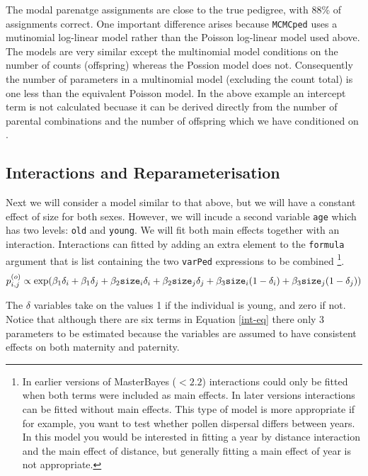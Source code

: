 \documentclass{article}
\begin{document}
The modal parenatge assignments are close to the true pedigree, with 88\% of assignments correct. One important difference arises because \texttt{MCMCped} uses a mutinomial log-linear model rather than the Poisson log-linear model used above.  The models are very similar except the multinomial model conditions on the number of counts (offspring) whereas the Possion model does not. Consequently the number of parameters in a multinomial model (excluding the count total) is one less than the equivalent Poisson model. In the above example an intercept term is not calculated becuase it can be derived directly from the number of parental combinations and the number of offspring which we have conditioned on \citep{McCullagh.1989}.  

\subsection{Interactions and Reparameterisation}

Next we will consider a model similar to that above, but we will have a constant effect of size for both sexes.  However, we will incude a second variable \texttt{age} which has two levels: \texttt{old} and \texttt{young}. We will fit both main effects together with an interaction.  Interactions can fitted by adding an extra element to the \texttt{formula} argument that is list containing the two \texttt{varPed} expressions to be combined \footnote{In earlier versions of MasterBayes ($<2.2$) interactions could only be fitted when both terms were included as main effects.  In later versions interactions can be fitted without main effects. This type of model is more appropriate if for example, you want to test whether pollen dispersal differs between years. In this model you would be interested in fitting a year by distance interaction and the main effect of distance, but generally fitting a main effect of year is not appropriate.}.\\

\begin{equation}
p^{(o)}_{i,j} \propto \textrm{exp}(\beta_{1}\delta_{i}+\beta_{1}\delta_{j}+\beta_{2}\textrm{\texttt{size}}_{i}\delta_{i}+\beta_{2}\textrm{\texttt{size}}_{j}\delta_{j}+\beta_{3}\textrm{\texttt{size}}_{i}(1-\delta_{i})+\beta_{3}\textrm{\texttt{size}}_{j}(1-\delta_{j}))
\label{int-eq}
\end{equation}

The $\delta$ variables take on the values 1 if the individual is young, and zero if not.  Notice that although there are six terms in Equation \ref{int-eq} there only 3 parameters to be estimated because the variables are assumed to have consistent effects on both maternity and paternity.   
\end{document}

